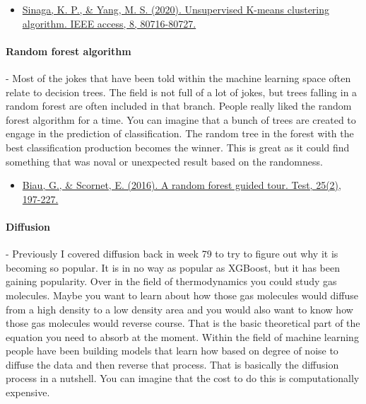 \documentclass{article}
\begin{document}
\begin{itemize}
\item \href{https://ieeexplore.ieee.org/stamp/stamp.jsp?arnumber=9072123 }{Sinaga, K. P., \& Yang, M. S. (2020). Unsupervised K-means clustering algorithm. IEEE access, 8, 80716-80727.} \cite{sinaga2020unsupervised}
\end{itemize}
 
\paragraph{Random forest algorithm} - Most of the jokes that have been told within the machine learning space often relate to decision trees. The field is not full of a lot of jokes, but trees falling in a random forest are often included in that branch. People really liked the random forest algorithm for a time. You can imagine that a bunch of trees are created to engage in the prediction of classification. The random tree in the forest with the best classification production becomes the winner. This is great as it could find something that was noval or unexpected result based on the randomness.

\begin{itemize}
\item \href{https://arxiv.org/pdf/1511.05741.pdf }{Biau, G., \& Scornet, E. (2016). A random forest guided tour. Test, 25(2), 197-227.} \cite{biau2016random}
\end{itemize} 

\paragraph{Diffusion} - Previously I covered diffusion back in week 79 to try to figure out why it is becoming so popular. It is in no way as popular as XGBoost, but it has been gaining popularity. Over in the field of thermodynamics you could study gas molecules. Maybe you want to learn about how those gas molecules would diffuse from a high density to a low density area and you would also want to know how those gas molecules would reverse course. That is the basic theoretical part of the equation you need to absorb at the moment. Within the field of machine learning people have been building models that learn how based on degree of noise to diffuse the data and then reverse that process. That is basically the diffusion process in a nutshell. You can imagine that the cost to do this is computationally expensive. 
\end{document}
